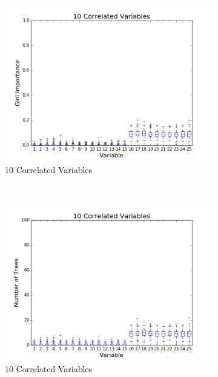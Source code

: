 \begin{figure}[H]
\begin{subfigure}[b]{0.45\textwidth}
    \includegraphics[width=\textwidth]{figures/random_forests/rf_correlated_1_0_10.png}
    \caption{10 Correlated Variables}
    \label{fig:corr-1-10}
  \end{subfigure}
  ~
  \begin{subfigure}[b]{0.45\textwidth}
    \includegraphics[width=\textwidth]{figures/random_forests/rf_correlated_1_0_10_feature_counts.png}
    \caption{10 Correlated Variables}
    \label{fig:corr-1-10-counts}
  \end{subfigure}
  ~
  \begin{subfigure}[b]{0.45\textwidth}

\end{subfigure}
\end{figure}
